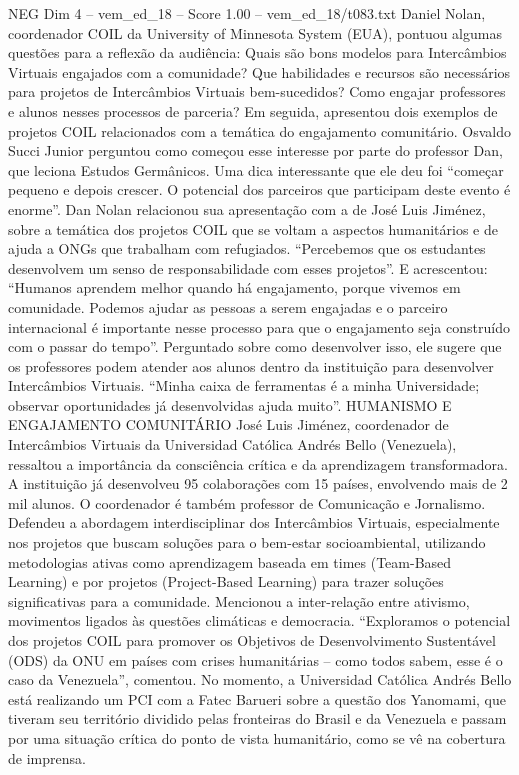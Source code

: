 \begin{textsample}{NEG Dim 4 – vem\_ed\_18 – Score 1.00 – vem\_ed\_18/t083.txt}  \label{ex:f4_neg_122}
Daniel Nolan, coordenador COIL da University of Minnesota System (EUA), pontuou algumas questões para a reflexão da audiência: Quais são bons modelos para Intercâmbios Virtuais engajados com a comunidade?
Que habilidades e recursos são necessários para projetos de Intercâmbios Virtuais bem-sucedidos?
Como engajar professores e alunos nesses processos de parceria?
Em seguida, apresentou dois exemplos de projetos COIL relacionados com a temática do engajamento comunitário.
Osvaldo Succi Junior perguntou como começou esse interesse por parte do professor Dan, que leciona Estudos Germânicos.
Uma dica interessante que ele deu foi “começar pequeno e depois crescer.
O potencial dos parceiros que participam deste evento é enorme”.
Dan Nolan relacionou sua apresentação com a de José Luis Jiménez, sobre a temática dos projetos COIL que se voltam a aspectos humanitários e de ajuda a ONGs que trabalham com refugiados. “Percebemos que os estudantes desenvolvem um senso de responsabilidade com esses projetos”.
E acrescentou: “Humanos aprendem melhor quando há engajamento, porque vivemos em comunidade.
Podemos ajudar as pessoas a serem engajadas e o parceiro internacional é importante nesse processo para que o engajamento seja construído com o passar do tempo”.
Perguntado sobre como desenvolver isso, ele sugere que os professores podem atender aos alunos dentro da instituição para desenvolver Intercâmbios Virtuais. “Minha caixa de ferramentas é a minha Universidade; observar oportunidades já desenvolvidas ajuda muito”.
HUMANISMO E ENGAJAMENTO COMUNITÁRIO José Luis Jiménez, coordenador de Intercâmbios Virtuais da Universidad Católica Andrés Bello (Venezuela), ressaltou a importância da consciência crítica e da aprendizagem transformadora.
A instituição já desenvolveu 95 colaborações com 15 países, envolvendo mais de 2 mil alunos.
O coordenador é também professor de Comunicação e Jornalismo.
Defendeu a abordagem interdisciplinar dos Intercâmbios Virtuais, especialmente nos projetos que buscam soluções para o bem-estar socioambiental, utilizando metodologias ativas como aprendizagem baseada em times (Team-Based Learning) e por projetos (Project-Based Learning) para trazer soluções significativas para a comunidade.
Mencionou a inter-relação entre ativismo, movimentos ligados às questões climáticas e democracia. “Exploramos o potencial dos projetos COIL para promover os Objetivos de Desenvolvimento Sustentável (ODS) da ONU em países com crises humanitárias – como todos sabem, esse é o caso da Venezuela”, comentou.
No momento, a Universidad Católica Andrés Bello está realizando um PCI com a Fatec Barueri sobre a questão dos Yanomami, que tiveram seu território dividido pelas fronteiras do Brasil e da Venezuela e passam por uma situação crítica do ponto de vista humanitário, como se vê na cobertura de imprensa.

\end{textsample}
